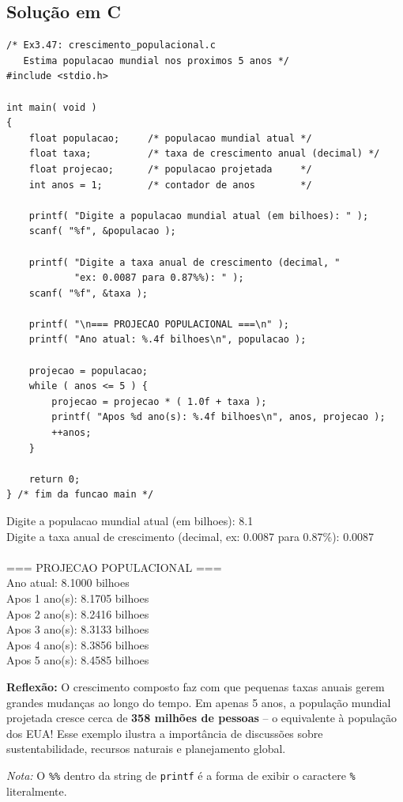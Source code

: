 \documentclass[12pt,a4paper]{article}
\begin{document}
\subsection*{Solução em C}

\begin{respostabox}
\begin{lstlisting}
/* Ex3.47: crescimento_populacional.c
   Estima populacao mundial nos proximos 5 anos */
#include <stdio.h>

int main( void )
{
    float populacao;     /* populacao mundial atual */
    float taxa;          /* taxa de crescimento anual (decimal) */
    float projecao;      /* populacao projetada     */
    int anos = 1;        /* contador de anos        */

    printf( "Digite a populacao mundial atual (em bilhoes): " );
    scanf( "%f", &populacao );

    printf( "Digite a taxa anual de crescimento (decimal, "
            "ex: 0.0087 para 0.87%%): " );
    scanf( "%f", &taxa );

    printf( "\n=== PROJECAO POPULACIONAL ===\n" );
    printf( "Ano atual: %.4f bilhoes\n", populacao );

    projecao = populacao;
    while ( anos <= 5 ) {
        projecao = projecao * ( 1.0f + taxa );
        printf( "Apos %d ano(s): %.4f bilhoes\n", anos, projecao );
        ++anos;
    }

    return 0;
} /* fim da funcao main */
\end{lstlisting}

\begin{saida}
Digite a populacao mundial atual (em bilhoes): 8.1\\
Digite a taxa anual de crescimento (decimal, ex: 0.0087 para 0.87\%): 0.0087\\
\\
=== PROJECAO POPULACIONAL ===\\
Ano atual: 8.1000 bilhoes\\
Apos 1 ano(s): 8.1705 bilhoes\\
Apos 2 ano(s): 8.2416 bilhoes\\
Apos 3 ano(s): 8.3133 bilhoes\\
Apos 4 ano(s): 8.3856 bilhoes\\
Apos 5 ano(s): 8.4585 bilhoes
\end{saida}

\medskip\textbf{Reflexão:} O crescimento composto faz com que pequenas taxas anuais
gerem grandes mudanças ao longo do tempo. Em apenas 5 anos, a população mundial
projetada cresce cerca de \textbf{358 milhões de pessoas} -- o equivalente à
população dos EUA! Esse exemplo ilustra a importância de discussões sobre
sustentabilidade, recursos naturais e planejamento global.

\textit{Nota:} O \texttt{\%\%} dentro da string de \texttt{printf} é a forma de
exibir o caractere \texttt{\%} literalmente.
\end{respostabox}
\end{document}
